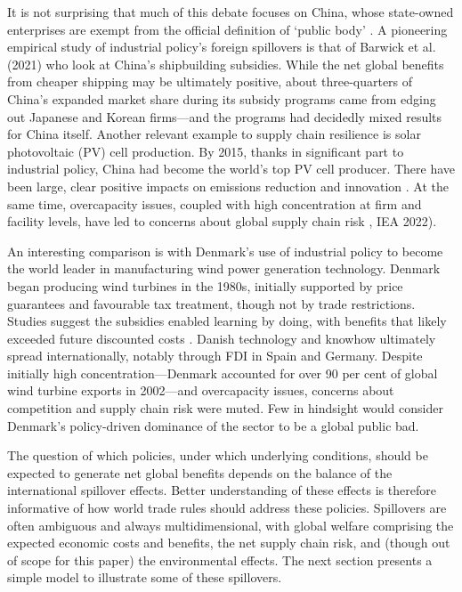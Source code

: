 \documentclass{article}
\begin{document}
It is not surprising that much of this debate focuses on China, whose state-owned enterprises are exempt from the official definition of `public body' \parencite[567]{bown_wtoing_2019}. A pioneering empirical study of industrial policy's foreign spillovers is that of Barwick et al. (2021) who look at China's shipbuilding subsidies. While the net global benefits from cheaper shipping may be ultimately positive, about three-quarters of China's expanded market share during its subsidy programs came from edging out Japanese and Korean firms---and the programs had decidedly mixed results for China itself. Another relevant example to supply chain resilience is solar photovoltaic (PV) cell production. By 2015, thanks in significant part to industrial policy, China had become the world’s top PV cell producer. There have been large, clear positive impacts on emissions reduction and innovation \parencite{xu_impact_2022}. At the same time, overcapacity issues, coupled with high concentration at firm and facility levels, have led to concerns about global supply chain risk \parencite{wang_why_2014}, IEA 2022).

An interesting comparison is with Denmark's use of industrial policy to become the world leader in manufacturing wind power generation technology. Denmark began producing wind turbines in the 1980s, initially supported by price guarantees and favourable tax treatment, though not by trade restrictions. Studies suggest the subsidies enabled learning by doing, with benefits that likely exceeded future discounted costs \parencite{hansen_establishment_2003}. Danish technology and knowhow ultimately spread internationally, notably through FDI in Spain and Germany. Despite initially high concentration---Denmark accounted for over 90 per cent of global wind turbine exports in 2002---and overcapacity issues, concerns about competition and supply chain risk were muted. Few in hindsight would consider Denmark's policy-driven dominance of the sector to be a global public bad.

The question of which policies, under which underlying conditions, should be expected to generate net global benefits depends on the balance of the international spillover effects. Better understanding of these effects is therefore informative of how world trade rules should address these policies. Spillovers are often ambiguous and always multidimensional, with global welfare comprising the expected economic costs and benefits, the net supply chain risk, and (though out of scope for this paper) the environmental effects. The next section presents a simple model to illustrate some of these spillovers.
\end{document}
